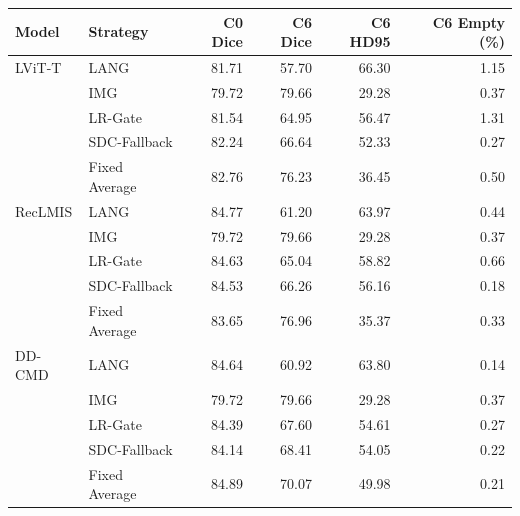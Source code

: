 \begin{tabular}{llrrrr}
\hline
Model & Strategy & C0 Dice & C6 Dice & C6 HD95 & C6 Empty (\%) \\
\hline
LViT-T & LANG & 81.71 & 57.70 & 66.30 & 1.15 \\
 & IMG & 79.72 & 79.66 & 29.28 & 0.37 \\
 & LR-Gate & 81.54 & 64.95 & 56.47 & 1.31 \\
 & SDC-Fallback & 82.24 & 66.64 & 52.33 & 0.27 \\
 & Fixed Average & 82.76 & 76.23 & 36.45 & 0.50 \\
\hline
RecLMIS & LANG & 84.77 & 61.20 & 63.97 & 0.44 \\
 & IMG & 79.72 & 79.66 & 29.28 & 0.37 \\
 & LR-Gate & 84.63 & 65.04 & 58.82 & 0.66 \\
 & SDC-Fallback & 84.53 & 66.26 & 56.16 & 0.18 \\
 & Fixed Average & 83.65 & 76.96 & 35.37 & 0.33 \\
\hline
DD-CMD & LANG & 84.64 & 60.92 & 63.80 & 0.14 \\
 & IMG & 79.72 & 79.66 & 29.28 & 0.37 \\
 & LR-Gate & 84.39 & 67.60 & 54.61 & 0.27 \\
 & SDC-Fallback & 84.14 & 68.41 & 54.05 & 0.22 \\
 & Fixed Average & 84.89 & 70.07 & 49.98 & 0.21 \\
\hline
\end{tabular}
